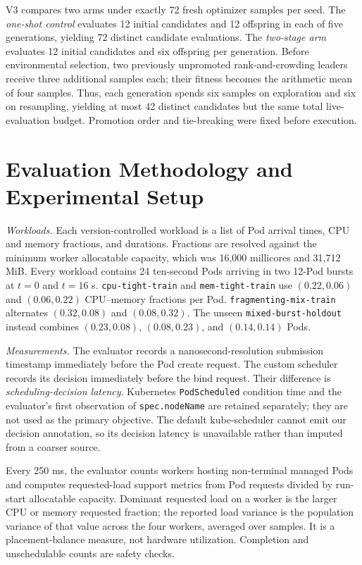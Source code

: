 \documentclass[conference]{IEEEtran}
\begin{document}
V3 compares two arms under exactly 72 fresh optimizer samples per seed. The \emph{one-shot control} evaluates 12 initial candidates and 12 offspring in each of five generations, yielding 72 distinct candidate evaluations. The \emph{two-stage arm} evaluates 12 initial candidates and six offspring per generation. Before environmental selection, two previously unpromoted rank-and-crowding leaders receive three additional samples each; their fitness becomes the arithmetic mean of four samples. Thus, each generation spends six samples on exploration and six on resampling, yielding at most 42 distinct candidates but the same total live-evaluation budget. Promotion order and tie-breaking were fixed before execution.

\section{Evaluation Methodology and Experimental Setup}
\textit{Workloads.} Each version-controlled workload is a list of Pod arrival times, CPU and memory fractions, and durations. Fractions are resolved against the minimum worker allocatable capacity, which was 16,000 millicores and 31,712 MiB. Every workload contains 24 ten-second Pods arriving in two 12-Pod bursts at $t=0$ and $t=16$ s. \texttt{cpu-tight-train} and \texttt{mem-tight-train} use $(0.22,0.06)$ and $(0.06,0.22)$ CPU--memory fractions per Pod. \texttt{fragmenting-mix-train} alternates $(0.32,0.08)$ and $(0.08,0.32)$. The unseen \texttt{mixed-burst-holdout} instead combines $(0.23,0.08)$, $(0.08,0.23)$, and $(0.14,0.14)$ Pods.

\textit{Measurements.} The evaluator records a nanosecond-resolution submission timestamp immediately before the Pod create request. The custom scheduler records its decision immediately before the bind request. Their difference is \emph{scheduling-decision latency}. Kubernetes \texttt{PodScheduled} condition time and the evaluator's first observation of \texttt{spec.nodeName} are retained separately; they are not used as the primary objective. The default kube-scheduler cannot emit our decision annotation, so its decision latency is unavailable rather than imputed from a coarser source.

Every 250 ms, the evaluator counts workers hosting non-terminal managed Pods and computes requested-load support metrics from Pod requests divided by run-start allocatable capacity. Dominant requested load on a worker is the larger CPU or memory requested fraction; the reported load variance is the population variance of that value across the four workers, averaged over samples. It is a placement-balance measure, not hardware utilization. Completion and unschedulable counts are safety checks.
\end{document}

